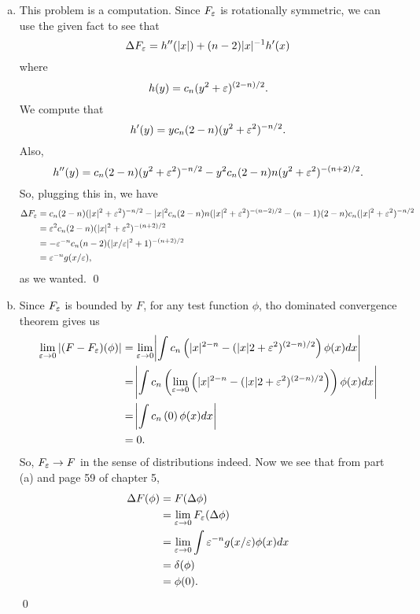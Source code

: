 \documentclass{article}
\begin{document}
\newpage
{} 
 \tri
\hop 
\solution
\begin{enumerate}[(a)]
    \item This problem is a computation. Since $F_\varepsilon$ is rotationally symmetric, we can use the given fact to see that 
    \[\Delta F_\varepsilon = h''(|x|) + (n-2)|x|{^{-1}} h'(x)\]
    where 
    \[h(y) = c_n(y^2+\varepsilon)^{(2-n)/2}.\]
    We compute that 
    \[h'(y) = yc_n(2-n)(y^2+\varepsilon^2)^{-n/2}.\]
    Also, 
    \[h''(y) = c_n(2-n)(y^2+\varepsilon^2)^{-n/2} - y^2c_n(2-n)n(y^2+\varepsilon^2)^{-(n+2)/2}.\]
    So, plugging this in, we have 
    \begin{align*}
        \Delta F_\varepsilon &= c_n (2-n)(|x|^2+\varepsilon^2)^{-n/2}- |x|^2c_n(2-n)n(|x|^2+\varepsilon^2)^{-(n-2)/2} - (n-1)(2-n)c_n(|x|^2 + \varepsilon^2)^{-n/2}\\
        &=\varepsilon^2 c_n(2-n)(|x|^2 + \varepsilon^2)^{-(n+2)/2}\\
        &=-\varepsilon^{-n} c_n(n-2)(|x/\varepsilon|^2 + 1)^{-(n+2)/2}\\
        &= \varepsilon^{-n}g(x/\varepsilon),
    \end{align*}
    as we wanted. \qed
    \item Since $F_\varepsilon$ is bounded by $F$, for any test function $\phi$, tho dominated convergence theorem gives us
    \begin{align*}
       \lim_{\eps \to 0} |(F-F_\eps)(\phi)| &= \lim_{\eps \to 0} \abs{\int c_n\del{|x|^{2-n} - (|x|2 + \eps^2)^{(2-n)/2} }\phi(x) dx} \\
       &=  \abs{\int c_n\del{ \lim_{\eps \to 0}\del{|x|^{2-n} - (|x|2 + \eps^2)^{(2-n)/2} }}\phi(x) dx}\\
       &=  \abs{\int c_n\del{0}\phi(x) dx}\\
       &= 0.
    \end{align*}
    So, $F_\varepsilon \to F$ in the sense of distributions indeed. 
    \hop 
    Now we see that from part (a) and page 59 of chapter 5,
    \begin{align*}
        \Delta F(\phi) &= F(\Delta \phi) \\
        &= \lim_{\varepsilon \to 0} F_\varepsilon (\Delta \phi) \\
        &= \lim_{\varepsilon \to 0} \int \varepsilon^{-n}g(x/\varepsilon) \phi(x) dx\\
        &= \delta(\phi) \\
        &= \phi(0).
    \end{align*}
    \qed
\end{enumerate}
\end{document}
